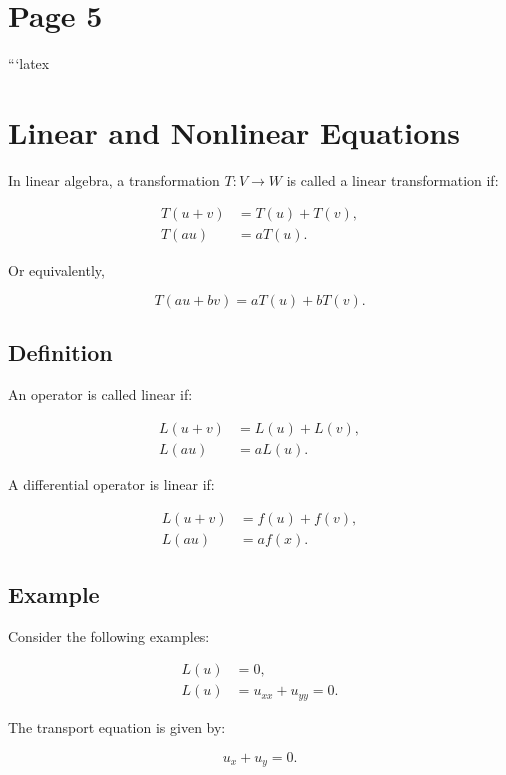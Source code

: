 \documentclass[11pt]{article}
\begin{document}
\section*{Page 5}

```latex
\section*{Linear and Nonlinear Equations}

In linear algebra, a transformation \( T: V \to W \) is called a linear transformation if:

\begin{align}
    T(u + v) &= T(u) + T(v), \\
    T(au) &= aT(u).
\end{align}

Or equivalently,

\begin{equation}
    T(au + bv) = aT(u) + bT(v).
\end{equation}

\subsection*{Definition}

An operator is called linear if:

\begin{align}
    L(u + v) &= L(u) + L(v), \\
    L(au) &= aL(u).
\end{align}

A differential operator is linear if:

\begin{align}
    L(u + v) &= f(u) + f(v), \\
    L(au) &= af(x).
\end{align}

\subsection*{Example}

Consider the following examples:

\begin{align}
    L(u) &= 0, \\
    L(u) &= u_{xx} + u_{yy} = 0.
\end{align}

The transport equation is given by:

\begin{equation}
    u_x + u_y = 0.
\end{equation}
\end{document}
